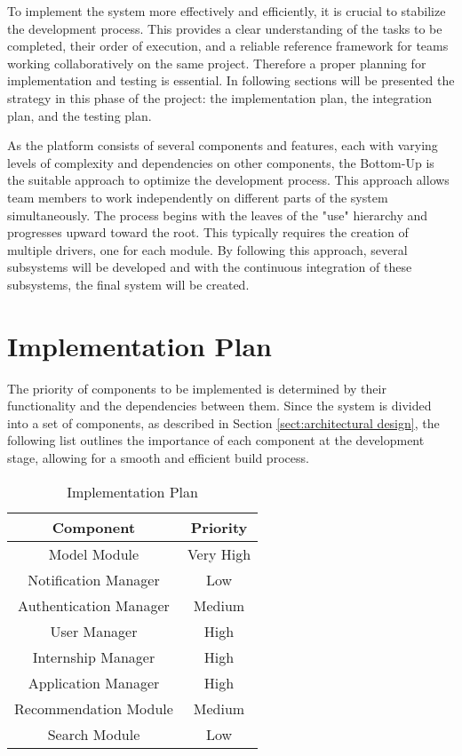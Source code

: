 \renewcommand{\thesection}{\Alph{section}}
To implement the system more effectively and efficiently, it is crucial to stabilize the development process. This provides a clear 
understanding of the tasks to be completed, their order of execution, and a reliable reference framework for teams working collaboratively 
on the same project. Therefore a proper planning for implementation and testing is essential. In following sections will be presented the
strategy in this phase of the project: the implementation plan, the integration plan, and the testing plan.

As the platform consists of several components and features, each with varying levels of complexity and dependencies on other components, 
the Bottom-Up is the suitable approach to optimize the development process. This approach allows team members to work independently on 
different parts of the system simultaneously. The process begins with the leaves of the "use" hierarchy and progresses upward toward the root.
This typically requires the creation of multiple drivers, one for each module. By following this approach, several subsystems will be developed 
and with the continuous integration of these subsystems, the final system will be created.

\section{Implementation Plan}\label{sec:implementation-plan}
The priority of components to be implemented is determined by their functionality and the dependencies between them. Since the system is divided 
into a set of components, as described in Section \ref{sect:architectural design}, the following list outlines the importance of each component
at the development stage, allowing for a smooth and efficient build process.
\begin{table}[H]
    \centering
    \begin{tabular}{|c|c|}
        \hline
        \textbf{Component} & \textbf{Priority} \\
        \hline
        Model Module & Very High \\
        \hline
        Notification Manager & Low \\
        \hline
        Authentication Manager & Medium \\
        \hline
        User Manager & High \\
        \hline
        Internship Manager & High \\
        \hline
        Application Manager & High \\
        \hline
        Recommendation Module & Medium \\
        \hline
        Search Module & Low \\
        \hline
    \end{tabular}
    \caption{Implementation Plan}\label{tab:implementation-plan}
\end{table}

